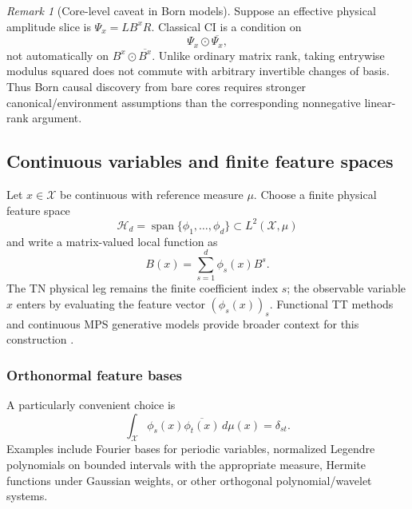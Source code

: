 \documentclass[11pt]{article}
\theoremstyle{remark}
\newtheorem{remark}[definition]{Remark}
\newcommand{\cH}{\mathcal H}
\newcommand{\odotc}{\mathbin{\odot}}
\begin{document}
\begin{remark}[Core-level caveat in Born models]
Suppose an effective physical amplitude slice is $\Psi_x=L B^x R$. Classical CI is a condition on
\begin{equation}
\Psi_x\odotc\overline{\Psi_x},
\end{equation}
not automatically on $B^x\odotc\overline{B^x}$. Unlike ordinary matrix rank, taking entrywise modulus squared does not commute with arbitrary invertible changes of basis. Thus Born causal discovery from bare cores requires stronger canonical/environment assumptions than the corresponding nonnegative linear-rank argument.
\end{remark}

\subsection{Continuous variables and finite feature spaces}
\label{sec:continuous}

Let $x\in\mathcal X$ be continuous with reference measure $\mu$. Choose a finite physical feature space
\begin{equation}
\cH_d=\operatorname{span}\{\phi_1,\ldots,\phi_d\}\subset L^2(\mathcal X,\mu)
\end{equation}
and write a matrix-valued local function as
\begin{equation}
B(x)=\sum_{s=1}^d \phi_s(x)B^s.
\label{eq:finite-feature-expansion}
\end{equation}
The TN physical leg remains the finite coefficient index $s$; the observable variable $x$ enters by evaluating the feature vector $(\phi_s(x))_s$. Functional TT methods and continuous MPS generative models provide broader context for this construction \cite{gorodetsky2019functional,meiburg2025continuous}.

\subsubsection{Orthonormal feature bases}

A particularly convenient choice is
\begin{equation}
\int_{\mathcal X}\phi_s(x)\overline{\phi_t(x)}\,d\mu(x)=\delta_{st}.
\label{eq:orthonormal-features}
\end{equation}
Examples include Fourier bases for periodic variables, normalized Legendre polynomials on bounded intervals with the appropriate measure, Hermite functions under Gaussian weights, or other orthogonal polynomial/wavelet systems.
\end{document}
